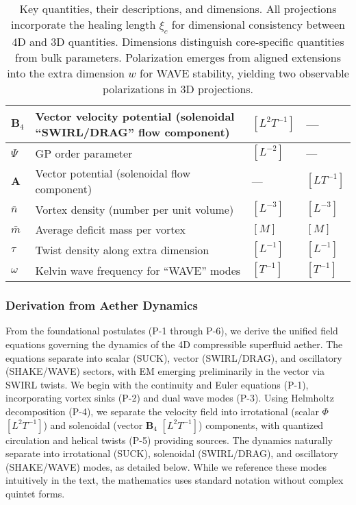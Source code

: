 \begin{table}[H]
\begin{tabularx}{\textwidth}{|l|Y|l|l|}
\hline
$\mathbf{B}_4$ & Vector velocity potential (solenoidal ``SWIRL/DRAG'' flow component) & $[L^2 T^{-1}]$ & --- \\
\hline
$\Psi$ & GP order parameter & $[L^{-2}]$ & --- \\
\hline
$\mathbf{A}$ & Vector potential (solenoidal flow component) & --- & $[L T^{-1}]$ \\
\hline
$\bar{n}$ & Vortex density (number per unit volume) & $[L^{-3}]$ & $[L^{-3}]$ \\
\hline
$\bar{m}$ & Average deficit mass per vortex & $[M]$ & $[M]$ \\
\hline
$\tau$ & Twist density along extra dimension & $[L^{-1}]$ & $[L^{-1}]$ \\
\hline
$\omega$ & Kelvin wave frequency for ``WAVE'' modes & $[T^{-1}]$ & $[T^{-1}]$ \\
\hline
\end{tabularx}
\caption{Key quantities, their descriptions, and dimensions. All projections incorporate the healing length $\xi_c$ for dimensional consistency between 4D and 3D quantities. Dimensions distinguish core-specific quantities from bulk parameters. Polarization emerges from aligned extensions into the extra dimension $w$ for WAVE stability, yielding two observable polarizations in 3D projections.}
\label{tab:notation}
\end{table}

\subsubsection{Derivation from Aether Dynamics}

From the foundational postulates (P-1 through P-6), we derive the unified field equations governing the dynamics of the 4D compressible superfluid aether. The equations separate into scalar (SUCK), vector (SWIRL/DRAG), and oscillatory (SHAKE/WAVE) sectors, with EM emerging preliminarily in the vector via SWIRL twists. We begin with the continuity and Euler equations (P-1), incorporating vortex sinks (P-2) and dual wave modes (P-3). Using Helmholtz decomposition (P-4), we separate the velocity field into irrotational (scalar $\Phi$ $[L^2 T^{-1}]$) and solenoidal (vector $\mathbf{B}_4$ $[L^2 T^{-1}]$) components, with quantized circulation and helical twists (P-5) providing sources. The dynamics naturally separate into irrotational (SUCK), solenoidal (SWIRL/DRAG), and oscillatory (SHAKE/WAVE) modes, as detailed below. While we reference these modes intuitively in the text, the mathematics uses standard notation without complex quintet forms.

